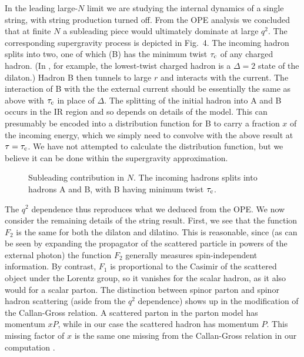 In the leading large-$N$ limit we are studying the internal
dynamics of a single string, with string production turned off.  From the OPE
analysis we concluded that at finite $N$ a subleading piece would ultimately
dominate at large $q^2$.  The corresponding supergravity process is depicted
in Fig.~4.  The incoming hadron splits into two, one of which (B) has the
minimum twist $\tau_{\rm c}$ of any charged hadron.  (In \nonestar, for
example, the lowest-twist charged hadron is a $\Delta=2$ state of the
dilaton.)  Hadron B then tunnels to large $r$ and interacts with the current.
The interaction of B with the the external current should be essentially the
same as above with
$\tau_{\rm c}$ in place of $\Delta$.  The splitting of the initial hadron
into A and B occurs in the IR region and so depends on details of the model.
This can presumably be encoded into a distribution function for B to carry a
fraction $x$ of the incoming energy, which we simply need to convolve 
with the above
result at $\tau = \tau_{\rm c}$.  We have not attempted
to calculate the distribution function, but we believe it can be done 
within the
supergravity approximation.
\begin{figure}
\begin{center}
\leavevmode
{}
\end{center}
\caption{Subleading contribution in $N$.  The incoming hadrons splits into
hadrons A and B, with B having minimum twist $\tau_{\rm c}$.}
\end{figure}

The $q^2$ dependence thus reproduces what we deduced from the
OPE.  We now consider the remaining details of the string result.  First, we
see that the function $F_2$ is the same for both
the dilaton and dilatino.  This is reasonable, since (as can be seen by
expanding the propagator of the scattered particle in powers of the
external photon) the function $F_2$ 
generally measures spin-independent
information.  By contrast, $F_1$ is proportional to the Casimir of the
scattered object under the Lorentz group, so it vanishes for the scalar hadron,
as it also would for a scalar parton.  The distinction between spinor parton and
spinor hadron scattering (aside from the $q^2$ dependence) shows up 
in the modification of the Callan-Gross relation.
A scattered parton in the parton model has momentum $xP$, while in our case
the scattered hadron has momentum $P$.  This missing factor of $x$ is the same
one missing from the Callan-Gross relation in our computation .


